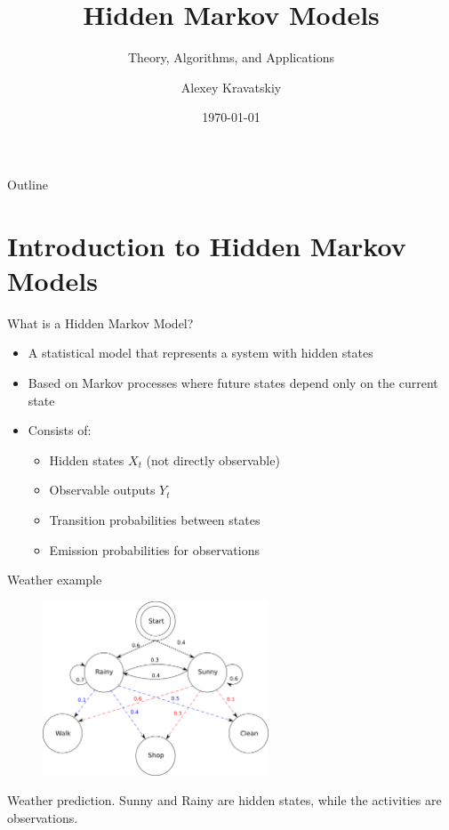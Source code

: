 \documentclass{beamer}
\title{Hidden Markov Models}
\subtitle{Theory, Algorithms, and Applications}
\author{Alexey Kravatskiy}
\date{\today}
\begin{document}
\begin{frame}
    \titlepage
\end{frame}


\begin{frame}{Outline}
    \tableofcontents
\end{frame}
\section{Introduction to Hidden Markov Models}

\begin{frame}{What is a Hidden Markov Model?}
    \begin{itemize}
        \item A statistical model that represents a system with hidden states
        \item Based on Markov processes where future states depend only on the current state
        \item Consists of:
        \begin{itemize}
            \item Hidden states $X_t$ (not directly observable)
            \item Observable outputs $Y_t$
            \item Transition probabilities between states
            \item Emission probabilities for observations
        \end{itemize}
    \end{itemize}
\end{frame}
\begin{frame}{Weather example}
    \begin{figure}[h]
        \centering
        \includegraphics[width=0.6\textwidth]{HMMGraph.pdf}
    \end{figure}
    Weather prediction. Sunny and Rainy are hidden states, while the activities are observations.
\end{frame}
\end{document}

